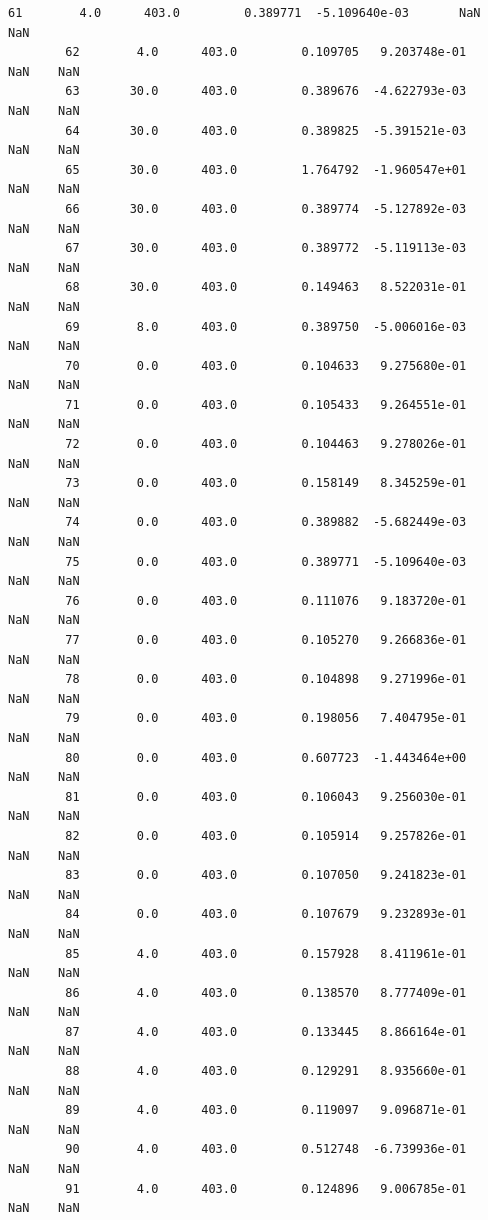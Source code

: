 \documentclass[11pt, a4paper , landscape]{article}
\begin{document}
\begin{Verbatim}[commandchars=\\\{\}]
        61        4.0      403.0         0.389771  -5.109640e-03       NaN    NaN  
        62        4.0      403.0         0.109705   9.203748e-01       NaN    NaN  
        63       30.0      403.0         0.389676  -4.622793e-03       NaN    NaN  
        64       30.0      403.0         0.389825  -5.391521e-03       NaN    NaN  
        65       30.0      403.0         1.764792  -1.960547e+01       NaN    NaN  
        66       30.0      403.0         0.389774  -5.127892e-03       NaN    NaN  
        67       30.0      403.0         0.389772  -5.119113e-03       NaN    NaN  
        68       30.0      403.0         0.149463   8.522031e-01       NaN    NaN  
        69        8.0      403.0         0.389750  -5.006016e-03       NaN    NaN  
        70        0.0      403.0         0.104633   9.275680e-01       NaN    NaN  
        71        0.0      403.0         0.105433   9.264551e-01       NaN    NaN  
        72        0.0      403.0         0.104463   9.278026e-01       NaN    NaN  
        73        0.0      403.0         0.158149   8.345259e-01       NaN    NaN  
        74        0.0      403.0         0.389882  -5.682449e-03       NaN    NaN  
        75        0.0      403.0         0.389771  -5.109640e-03       NaN    NaN  
        76        0.0      403.0         0.111076   9.183720e-01       NaN    NaN  
        77        0.0      403.0         0.105270   9.266836e-01       NaN    NaN  
        78        0.0      403.0         0.104898   9.271996e-01       NaN    NaN  
        79        0.0      403.0         0.198056   7.404795e-01       NaN    NaN  
        80        0.0      403.0         0.607723  -1.443464e+00       NaN    NaN  
        81        0.0      403.0         0.106043   9.256030e-01       NaN    NaN  
        82        0.0      403.0         0.105914   9.257826e-01       NaN    NaN  
        83        0.0      403.0         0.107050   9.241823e-01       NaN    NaN  
        84        0.0      403.0         0.107679   9.232893e-01       NaN    NaN  
        85        4.0      403.0         0.157928   8.411961e-01       NaN    NaN  
        86        4.0      403.0         0.138570   8.777409e-01       NaN    NaN  
        87        4.0      403.0         0.133445   8.866164e-01       NaN    NaN  
        88        4.0      403.0         0.129291   8.935660e-01       NaN    NaN  
        89        4.0      403.0         0.119097   9.096871e-01       NaN    NaN  
        90        4.0      403.0         0.512748  -6.739936e-01       NaN    NaN  
        91        4.0      403.0         0.124896   9.006785e-01       NaN    NaN  

\end{Verbatim}
\end{document}
